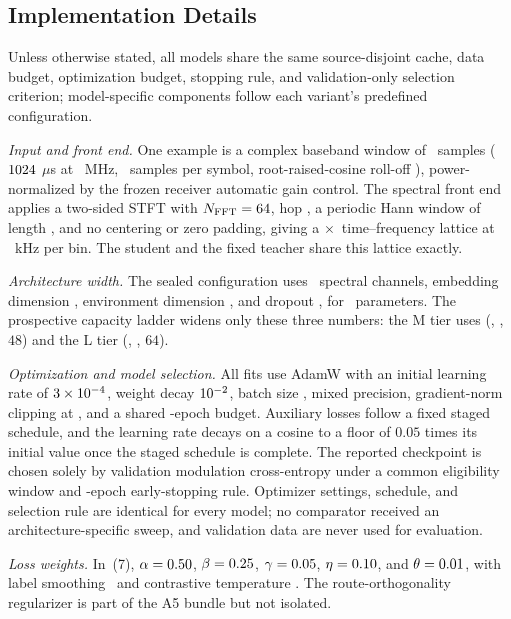 \documentclass[letterpaper,journal]{IEEEtran}
\begin{document}
\subsection{Implementation Details}
\label{sec:impl}
Unless otherwise stated, all models share the same source-disjoint cache, data
budget, optimization budget, stopping rule, and validation-only selection
criterion; model-specific components follow each variant's predefined
configuration.

\emph{Input and front end.} One example is a complex baseband window of
\WindowSamples\ samples ($1024$ $\mu$s at \SampleRateMHz\ MHz,
\SamplesPerSymbol\ samples per symbol, root-raised-cosine roll-off
\RrcRolloff), power-normalized by the frozen receiver automatic gain control. The spectral
front end
applies a two-sided STFT with $N_{\mathrm{FFT}}=64$, hop \HopLength, a
periodic Hann window of length \NFft, and no centering or zero padding, giving
a \StftBins$\times$\StftFrames\ time--frequency lattice at \StftBinHz\ kHz per
bin. The student and the fixed teacher share this lattice exactly.

\emph{Architecture width.} The sealed configuration uses \SpectralChannels\
spectral channels, embedding dimension \EmbeddingDim, environment dimension
\EnvironmentDim, and dropout \DropoutRate, for \ParamsAFive\ parameters. The
prospective capacity ladder widens only these three numbers: the M tier uses
(\CapacityMSpectral, \CapacityMEmbedding, $48$) and the L tier
(\CapacityLSpectral, \CapacityLEmbedding, $64$).

\emph{Optimization and model selection.} All fits use AdamW with an initial
learning rate of $3\times10^{-4}$, weight decay $10^{-2}$, batch size
\TrainBatch, mixed precision, gradient-norm clipping at \GradClip, and a shared
\TrainEpochs-epoch budget. Auxiliary losses follow a fixed staged schedule, and
the learning rate decays on a cosine to a floor of $0.05$ times its initial
value once the staged schedule is complete. The reported checkpoint is chosen solely by validation
modulation cross-entropy under a common eligibility window and
\TrainPatience-epoch early-stopping rule. Optimizer settings, schedule, and
selection rule are identical for every model; no comparator received an
architecture-specific sweep, and validation data are never used for evaluation.

\emph{Loss weights.} In~(7), $\alpha=0.50$, $\beta=0.25$,
$\gamma=0.05$, $\eta=0.10$, and $\theta=0.01$, with label
smoothing \LabelSmoothing\ and contrastive temperature \ContrastTemp. The
route-orthogonality regularizer is part of the A5 bundle but not isolated.
\end{document}
